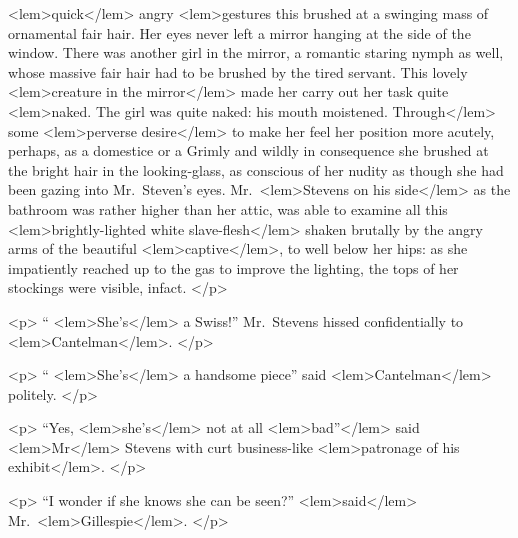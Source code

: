 {{<lem>quick</lem>
					{}
				angry 
<lem>gestures this 
					{} 
				brushed at a swinging mass of ornamental 
				fair hair. Her eyes never left a mirror hanging at the side of the window. There was 
				another girl in the mirror, a romantic staring nymph as well, whose massive fair 
				hair had to be brushed by the tired servant. This lovely 
<lem>creature in the mirror</lem>
					{} 
				made her carry out 
				her task quite 
<lem>naked. The girl was quite naked: his mouth moistened. Through</lem>
					{} 
				some 
<lem>perverse desire</lem>
					{} 
				to make her feel her position more 
				acutely, perhaps, as a domestice or a 
					{} 
				Grimly and wildly in consequence she brushed at the bright hair in the 
				looking-glass, as conscious of her nudity as though she had been gazing into Mr.\ 
				Steven's eyes. Mr.\ 
<lem>Stevens on his side</lem>
					{} 
				as the bathroom was rather higher than her 
				attic, was able to examine all this 
<lem>brightly-lighted white slave-flesh</lem>
					{} 
				shaken brutally by the 
				angry arms of the beautiful 
<lem>captive</lem>{}, 
				to well below her hips: as she impatiently 
				reached up to the gas to improve the lighting, the tops of her stockings were visible, 
				infact. 
 				</p> 

				<p>
				“
<lem>She's</lem>
					{} 
				a Swiss!” Mr.\ Stevens hissed confidentially to 
<lem>Cantelman</lem>{}. 
				</p> 

				<p>
“
<lem>She's</lem>
					{} 
				a handsome piece” said 
<lem>Cantelman</lem>{} politely. 
 				</p> 

				<p>
				“Yes, 
<lem>she's</lem>
					{} 
				not at all 
<lem>bad”</lem>
					{} 
				said 
<lem>Mr</lem>
					{} 
				Stevens with curt business-like 
<lem>patronage of his exhibit</lem>{}. 
 				</p> 

				<p>
				“I wonder if she knows she can be seen?” 
<lem>said</lem>
					{} 
				Mr.\ 
<lem>Gillespie</lem>{}. 
 				</p> 

}}
